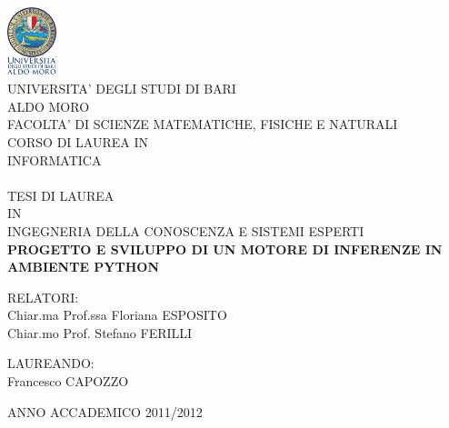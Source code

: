 
\begin{center}
\includegraphics[height=2cm]{Immagini/logo.png}\\
\LARGE{UNIVERSITA' DEGLI STUDI DI BARI}\\
\LARGE{ALDO MORO}\\
\vspace{0.5cm}
\small{FACOLTA' DI SCIENZE MATEMATICHE, FISICHE E NATURALI}\\
CORSO DI LAUREA IN\\
INFORMATICA\\
\hrulefill \\ %
\vspace{0.2cm}
TESI DI LAUREA\\
\vspace{0.2cm}
IN\\
\vspace{0.2cm}
\normalsize{INGEGNERIA DELLA CONOSCENZA E SISTEMI ESPERTI}\\
\vspace{2cm}%
\large{\textbf{PROGETTO E SVILUPPO DI UN MOTORE DI INFERENZE IN AMBIENTE PYTHON}}\\
\thispagestyle{empty}%
\end{center}
\vspace{3cm}
RELATORI:\\
Chiar.ma Prof.ssa Floriana ESPOSITO\\
Chiar.mo Prof. Stefano FERILLI

\begin{flushright}
LAUREANDO:\\
Francesco CAPOZZO\\
\end{flushright}
\hrulefill
\begin{center}
\small{ANNO ACCADEMICO 2011/2012}
\end{center}